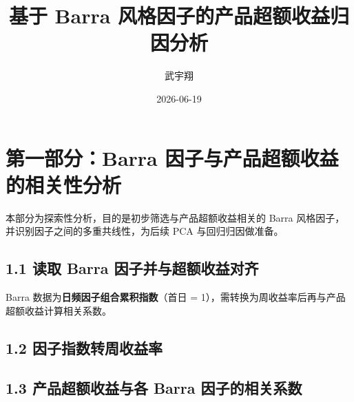 \documentclass[
]{article}
\title{基于 Barra 风格因子的产品超额收益归因分析}
\author{武宇翔}
\date{2026-06-19}
\begin{document}
\maketitle

\section{第一部分：Barra
因子与产品超额收益的相关性分析}\label{ux7b2cux4e00ux90e8ux5206barra-ux56e0ux5b50ux4e0eux4ea7ux54c1ux8d85ux989dux6536ux76caux7684ux76f8ux5173ux6027ux5206ux6790}

本部分为探索性分析，目的是初步筛选与产品超额收益相关的 Barra
风格因子，并识别因子之间的多重共线性，为后续 PCA 与回归归因做准备。

\subsection{1.1 读取 Barra
因子并与超额收益对齐}\label{ux8bfbux53d6-barra-ux56e0ux5b50ux5e76ux4e0eux8d85ux989dux6536ux76caux5bf9ux9f50}

Barra 数据为\textbf{日频因子组合累积指数}（首日 =
1），需转换为周收益率后再与产品超额收益计算相关系数。

\subsection{1.2
因子指数转周收益率}\label{ux56e0ux5b50ux6307ux6570ux8f6cux5468ux6536ux76caux7387}

\subsection{1.3 产品超额收益与各 Barra
因子的相关系数}\label{ux4ea7ux54c1ux8d85ux989dux6536ux76caux4e0eux5404-barra-ux56e0ux5b50ux7684ux76f8ux5173ux7cfbux6570}
\end{document}
